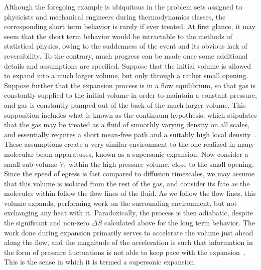 Although the foregoing example is ubiquitous in the problem sets assigned to physicists and mechanical engineers during thermodynamics classes, the corresponding short term behavior is rarely if ever treated.
At first glance, it may seem that the short term behavior would be intractable to the methods of statistical physics, owing to the suddenness of the event and its obvious lack of reversibility.
To the contrary, much progress can be made once some additional details and assumptions are specified.
Suppose that the initial volume is allowed to expand into a much larger volume, but only through a rather small opening.
Suppose further that the expansion process is in a flow equilibrium, so that gas is constantly supplied to the initial volume in order to maintain a constant pressure, and gas is constantly pumped out of the back of the much larger volume.
This supposition includes what is known as the continuum hypothesis, which stipulates that the gas may be treated as a fluid of smoothly varying density on all scales, and essentially requires a short mean-free path and a suitably high local density~\citep[Sec.~1.2]{Batchelor1967}.
These assumptions create a very similar environment to the one realized in many molecular beam apparatuses, known as a supersonic expansion.
Now consider a small sub-volume $V_1$ within the high pressure volume, close to the small opening.
Since the speed of egress is fast compared to diffusion timescales, we may assume that this volume is isolated from the rest of the gas, and consider its fate as the molecules within follow the flow lines of the fluid.
As we follow the flow lines, this volume expands, performing work on the surrounding environment, but not exchanging any heat with it.
Paradoxically, the process is then adiabatic, despite the significant and non-zero $\Delta S$ calculated above for the long term behavior.
The work done during expansion primarily serves to accelerate the volume just ahead along the flow, and the magnitude of the acceleration is such that information in the form of pressure fluctuations is not able to keep pace with the expansion~\cite{Miller1988,StuhlThesis2012}.
This is the sense in which it is termed a supersonic expansion.

